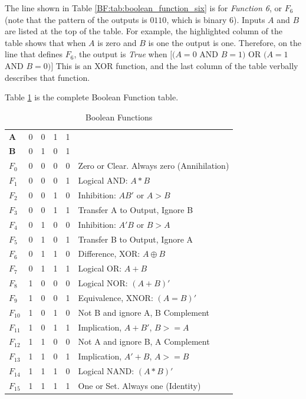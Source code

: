 The line shown in Table \ref{BF:tab:boolean_function_six} is for \emph{Function 6}, or $ F_6 $ (note that the pattern of the outputs is $ 0110 $, which is binary $ 6 $). Inputs $ A $ and $ B $ are listed at the top of the table. For example, the highlighted column of the table shows that when $ A $ is zero and $ B $ is one the output is one. Therefore, on the line that defines $ F_6 $, the output is \emph{True} when $ [ (A=0 $ \textsf{AND} $ B=1) $ \textsf{OR} $ (A=1 $ \textsf{AND} $ B=0) ] $ This is an \textsf{XOR} function, and the last column of the table verbally describes that function.   

Table \ref{BF:tab:boolean_functions} is the complete Boolean Function table.

\begin{table}[H]
  \sffamily
  \newcommand{\head}[1]{\textcolor{white}{\textbf{#1}}}    
  \begin{center}
    \begin{tabular}{llllll}
    \textbf{A} & 0 & 0 & 1 & 1 &  \\ 
    \textbf{B} & 0 & 1 & 0 & 1 &  \\ \hline
    $ F_{0} $ & 0 & 0 & 0 & 0 
      & Zero or Clear. Always zero (Annihilation) \\ 
    $ F_{1} $ & 0 & 0 & 0 & 1 
      & Logical AND: $ A * B $  \\ 
    $ F_{2} $ & 0 & 0 & 1 & 0 
      & Inhibition: $ AB' $ or $ A>B $ \\ 
    $ F_{3} $ & 0 & 0 & 1 & 1 
      & Transfer A to Output, Ignore B \\ 
    $ F_{4} $ & 0 & 1 & 0 & 0 
      & Inhibition: $ A'B $ or $ B>A $ \\ 
    $ F_{5} $ & 0 & 1 & 0 & 1 
      & Transfer B to Output, Ignore A \\ 
    $ F_{6} $ & 0 & 1 & 1 & 0 
      & Difference, XOR: $ A \oplus B $ \\ 
    $ F_{7} $ & 0 & 1 & 1 & 1 
      & Logical OR: $ A + B $ \\ 
    $ F_{8} $ & 1 & 0 & 0 & 0 
      & Logical NOR: $ (A + B)' $ \\ 
    $ F_{9} $ & 1 & 0 & 0 & 1 
      & Equivalence, XNOR: $ (A = B)' $ \\ 
    $ F_{10} $ & 1 & 0 & 1 & 0 
      & Not B and ignore A, B Complement \\ 
    $ F_{11} $ & 1 & 0 & 1 & 1 
      & Implication, $ A + B' $, $ B >= A $ \\ 
    $ F_{12} $ & 1 & 1 & 0 & 0 
      & Not A and ignore B, A Complement \\ 
    $ F_{13} $ & 1 & 1 & 0 & 1 
      & Implication, $ A' + B $, $ A >= B $ \\ 
    $ F_{14} $ & 1 & 1 & 1 & 0 
      & Logical NAND: $ (A*B)' $ \\ 
    $ F_{15} $ & 1 & 1 & 1 & 1 
      & One or Set. Always one (Identity) \\ 
    \end{tabular} 
  \end{center}
  \caption{Boolean Functions}
  \label{BF:tab:boolean_functions}
\end{table}

